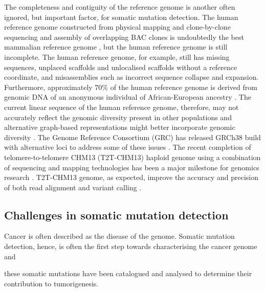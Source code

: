 The completeness and contiguity of the reference genome is another often ignored, but important factor, for somatic mutation detection. The human reference genome constructed from physical mapping and clone-by-clone sequencing and assembly of overlapping BAC clones is undoubtedly the best mammalian reference genome \cite{Lander2001-du}, but the human reference genome is still incomplete. The human reference genome, for example, still has missing sequences, unplaced scaffolds and unlocalised scaffolds without a reference coordinate, and misassemblies such as incorrect sequence collapse and expansion. Furthermore, approximately 70\% of the human reference genome is derived from genomic DNA of an anonymous individual of African-European ancestry \cite{Osoegawa2001-np}. The current linear sequence of the human reference genome, therefore, may not accurately reflect the genomic diversity present in other populations and alternative graph-based representations might better incorporate genomic diversity \cite{Garrison2018-ae}. The Genome Reference Consortium (GRC) has released GRCh38 build with alternative loci to address some of these issues \cite{Schneider2017-yo}. The recent completion of telomere-to-telomere CHM13 (T2T-CHM13) haploid genome using a combination of sequencing and mapping technologies has been a major milestone for genomics research \cite{Nurk2022-dv}. T2T-CHM13 genome, as expected, improve the accuracy and precision of both read alignment and variant calling \cite{Aganezov2022-dv}. 


\subsection{Challenges in somatic mutation detection}

Cancer is often described as the disease of the genome. Somatic mutation detection, hence, is often the first step towards characterising the cancer genome and 

these somatic mutations have been catalogued and analysed to determine their contribution to tumorigenesis. 

